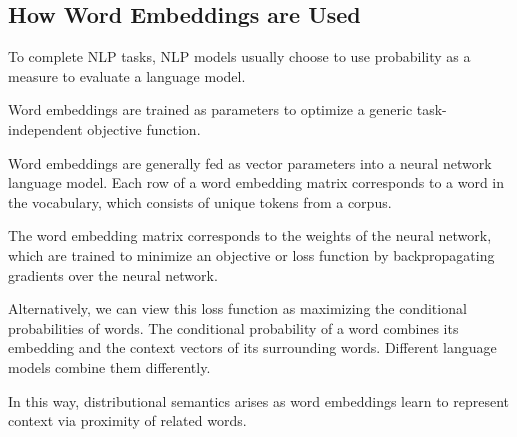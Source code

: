 \subsection{How Word Embeddings are Used}

To complete NLP tasks, NLP models usually choose to use probability as a measure to evaluate a language model. 

Word embeddings are trained as parameters to optimize a generic task-independent objective function. 

Word embeddings are generally fed as vector parameters into a neural network language model. Each row of a word embedding matrix corresponds to a word in the vocabulary, which consists of unique tokens from a corpus. 

The word embedding matrix corresponds to the weights of the neural network, which are trained to minimize an objective or loss function by backpropagating gradients over the neural network. 

Alternatively, we can view this loss function as maximizing the conditional probabilities of words. The conditional probability of a word combines its embedding and the context vectors of its surrounding words. Different language models combine them differently. 

In this way, distributional semantics arises as word embeddings learn to represent context via proximity of related words.  
